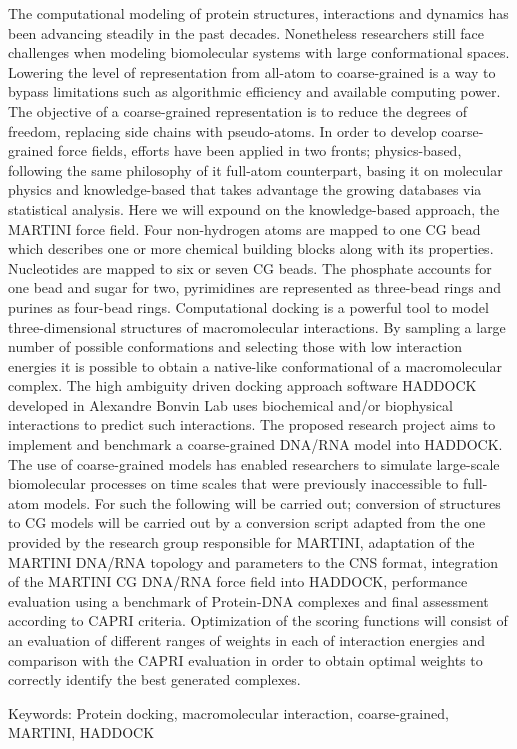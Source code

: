 \documentclass[
	12pt,				%
	openright,			%
	twoside,			%
	a4paper,			%
	english,			%
	french,				%
	spanish,			%
	brazil,				%
	]{abntex2}
\begin{document}
\begin{resumo}[Abstract]
The computational modeling of protein structures, interactions and dynamics has been advancing steadily in the past decades. Nonetheless researchers still face challenges when modeling biomolecular systems with large conformational spaces. Lowering the level of representation from all-atom to coarse-grained is a way to bypass limitations such as algorithmic efficiency and available computing power. The objective of a coarse-grained representation is to reduce the degrees of freedom, replacing side chains with pseudo-atoms. In order to develop coarse-grained force fields, efforts have been applied in two fronts; physics-based, following the same philosophy of it full-atom counterpart, basing it on molecular physics and knowledge-based that takes advantage the growing databases via statistical analysis. Here we will expound on the knowledge-based approach, the MARTINI force field. Four non-hydrogen atoms are mapped to one CG bead which describes one or more chemical building blocks along with its properties. Nucleotides are mapped to six or seven CG beads. The phosphate accounts for one bead and sugar for two, pyrimidines are represented as three-bead rings and purines as four-bead rings. Computational docking is a powerful tool to model three-dimensional structures of macromolecular interactions. By sampling a large number of possible conformations and selecting those with low interaction energies it is possible to obtain a native-like conformational of a macromolecular complex. The high ambiguity driven docking approach software HADDOCK developed in Alexandre Bonvin Lab uses biochemical and/or biophysical interactions to predict such interactions. The proposed research project aims to implement and benchmark a coarse-grained DNA/RNA model into HADDOCK. The use of coarse-grained models has enabled researchers to simulate large-scale biomolecular processes on time scales that were previously inaccessible to full-atom models. For such the following will be carried out; conversion of structures to CG models will be carried out by a conversion script adapted from the one provided by the research group responsible for MARTINI, adaptation of the MARTINI DNA/RNA topology and parameters to the CNS format, integration of the MARTINI CG DNA/RNA force field into HADDOCK, performance evaluation using a benchmark of Protein-DNA complexes and final assessment according to CAPRI criteria. Optimization of the scoring functions will consist of an evaluation of different ranges of weights in each of interaction energies and comparison with the CAPRI evaluation in order to obtain optimal weights to correctly identify the best generated complexes. 

Keywords: Protein docking, macromolecular interaction, coarse-grained, MARTINI, HADDOCK

\end{resumo}
\end{document}
